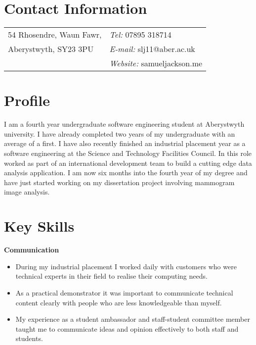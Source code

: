 \documentclass[margin,line]{res}
\begin{document}

\begin{resume}
\section{\sc Contact Information}
\vspace{.05in}
\begin{tabular}{@{}p{2in}p{4in}}
54 Rhosendre, Waun Fawr,             & {\it Tel:}  07895 318714 \\
Aberystwyth, SY23 3PU & {\it E-mail:}  slj11@aber.ac.uk\\
 & {\it Website:} samueljackson.me
\end{tabular}

\section{\sc Profile}
I am a fourth year undergraduate software engineering student at Aberystwyth university. I have already completed two years of my undergraduate with an average of a first. I have also recently finished an industrial placement year as a software engineering at the Science and Technology Facilities Council. In this role worked as part of an international development team to build a cutting edge data analysis application. I am now six months into the fourth year of my degree and have just started working on my dissertation project involving mammogram image analysis.

\section{\sc Key Skills}

{\bf Communication} 

\begin{itemize}
\item During my industrial placement I worked daily with customers who were technical experts in their field to realise their computing needs. 
\item As a practical demonstrator it was important to communicate technical content clearly with people who are less knowledgeable than myself. 
\item My experience as a student ambassador and staff-student committee member taught me to communicate ideas and opinion effectively to both staff and students.
\end{itemize}


\end{resume}
\end{document}
